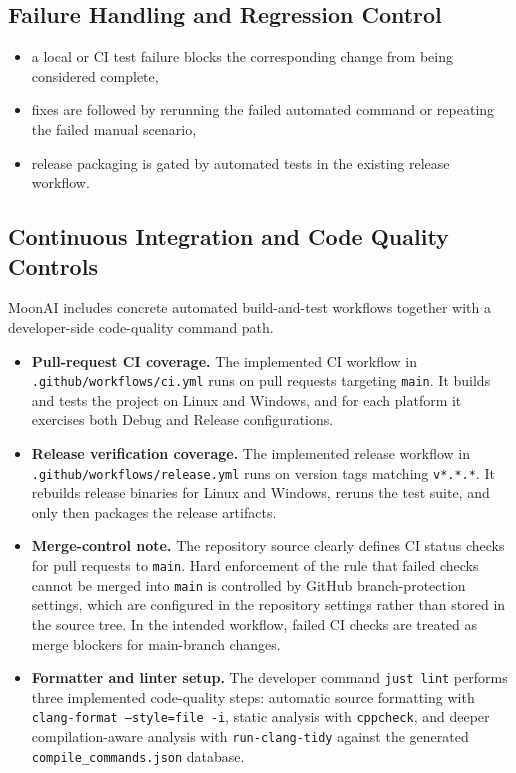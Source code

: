 \subsection{Failure Handling and Regression Control}

\begin{itemize}[nosep]
	\item a local or CI test failure blocks the corresponding change from being considered complete,
	\item fixes are followed by rerunning the failed automated command or repeating the failed manual scenario,
	\item release packaging is gated by automated tests in the existing release workflow.
\end{itemize}

\subsection{Continuous Integration and Code Quality Controls}

MoonAI includes concrete automated build-and-test workflows together with a developer-side
code-quality command path.

\begin{itemize}[leftmargin=*]
	\item \textbf{Pull-request CI coverage.} The implemented CI workflow in
	      \texttt{.github/workflows/ci.yml} runs on pull requests targeting \texttt{main}. It
	      builds and tests the project on Linux and Windows, and for each platform it exercises
	      both Debug and Release configurations.

	\item \textbf{Release verification coverage.} The implemented release workflow in
	      \texttt{.github/workflows/release.yml} runs on version tags matching
	      \texttt{v*.*.*}. It rebuilds release binaries for Linux and Windows, reruns the test
	      suite, and only then packages the release artifacts.

	\item \textbf{Merge-control note.} The repository source clearly defines CI status checks
	      for pull requests to \texttt{main}. Hard enforcement of the rule that failed checks
	      cannot be merged into \texttt{main} is controlled by GitHub branch-protection settings,
	      which are configured in the repository settings rather than stored in the source tree.
	      In the intended workflow, failed CI checks are treated as merge blockers for main-branch changes.

	\item \textbf{Formatter and linter setup.} The developer command \texttt{just lint}
	      performs three implemented code-quality steps: automatic source formatting with
	      \texttt{clang-format --style=file -i}, static analysis with \texttt{cppcheck}, and
	      deeper compilation-aware analysis with \texttt{run-clang-tidy} against the generated
	      \texttt{compile\_commands.json} database.
\end{itemize}


